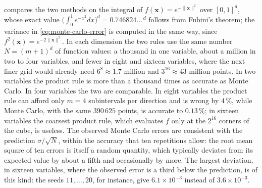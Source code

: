  compares the two methods on the integral of $f(\mathbf x)=e^{-\|\mathbf x\|^2}$ over $[0,1]^d$, whose exact value $\bigl(\int_0^1e^{-x^2}dx\bigr)^d=0.746824\ldots^{\,d}$ follows from Fubini's theorem; the variance in \eqref{eq:monte-carlo-error} is computed in the same way, since $f^2(\mathbf x)=e^{-2\|\mathbf x\|^2}$. In each dimension the two rules use the same number $N=(m+1)^d$ of function values: a thousand in one variable, about a million in two to four variables, and fewer in eight and sixteen variables, where the next finer grid would already need $6^8\approx1.7$ million and $3^{16}\approx43$ million points. In two variables the product rule is more than a thousand times as accurate as Monte Carlo. In four variables the two are comparable. In eight variables the product rule can afford only $m=4$ subintervals per direction and is wrong by $4\,\%$, while Monte Carlo, with the same $390\,625$ points, is accurate to $0.13\,\%$; in sixteen variables the coarsest product rule, which evaluates $f$ only at the $2^{16}$ corners of the cube, is useless. The observed Monte Carlo errors are consistent with the prediction $\sigma/\sqrt N$, within the accuracy that ten repetitions allow: the root mean square of ten errors is itself a random quantity, which typically deviates from its expected value by about a fifth and occasionally by more. The largest deviation, in sixteen variables, where the observed error is a third below the prediction, is of this kind: the seeds $11,\ldots,20$, for instance, give $6.1\times10^{-3}$ instead of $3.6\times10^{-3}$.

\begin{table}
\end{table}


